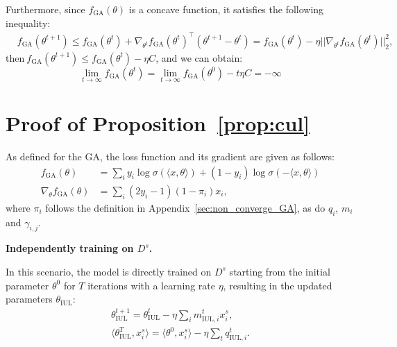 \documentclass{article}
\theoremstyle{plain}
\theoremstyle{definition}
\theoremstyle{remark}
\begin{document}
Furthermore, since $f_{\text{GA}}(\theta)$ is a concave function, it satisfies the following inequality:
\begin{equation}
\begin{aligned}    
    &f_{\text{GA}}(\theta^{t+1})\leq f_{\text{GA}}(\theta^{t})+\nabla_{\theta^t} f_{\text{GA}}(\theta^t)^\top(\theta^{t+1}-\theta^{t})=f_{\text{GA}}(\theta^{t})-\eta||\nabla_{\theta^t} f_{\text{GA}}(\theta^t)||_2^2,
\end{aligned}
\end{equation}
$\text{then}~f_{\text{GA}}(\theta^{t+1})\leq f_{\text{GA}}(\theta^{t})-\eta C$, and we can obtain:
\begin{equation}
    \lim_{t\rightarrow\infty}f_{\text{GA}}(\theta^{t})=\lim_{t\rightarrow\infty} f_{\text{GA}}(\theta^{0})-t\eta C=-\infty
\end{equation}





 






\section{Proof of Proposition~\ref{prop:cul}}
\label{sec:app_proof_cul}

As defined for the GA, the loss function and its gradient are given as follows:
\begin{equation}
\begin{aligned}
    f_{\text{GA}} (\theta) &=\sum_{i}y_i\log\sigma(\langle x,\theta\rangle)+(1-y_i)\log\sigma(-\langle x,\theta\rangle)\\
    \nabla_{\theta} f_{\text{GA}}(\theta)&=\sum_i (2y_i-1)(1-\pi_i)x_i,
\end{aligned}    
\end{equation}
where $\pi_i$ follows the definition in Appendix~\ref{sec:non_converge_GA}, as do $q_i$, $m_i$ and $\gamma_{i,j}$.


\textbf{Independently training on $D^s$.}

In this scenario, the model is directly trained on $D^s$ starting from the initial parameter $\theta^0$ for $T$ iterations with a learning rate $\eta$, resulting in the updated parameters $\theta_\text{IUL}$:
\begin{equation}
\begin{aligned}
\theta_\text{IUL}^{t+1}=\theta_\text{IUL}^{t}-\eta \sum_i m_{\text{IUL},i}^t x^s_i,\\
\langle\theta_\text{IUL}^{T}, x^s_i\rangle=\langle\theta^{0},x_i^s\rangle-\eta \sum_t q_{\text{IUL},i}^t.
\end{aligned}
\end{equation}
\end{document}
